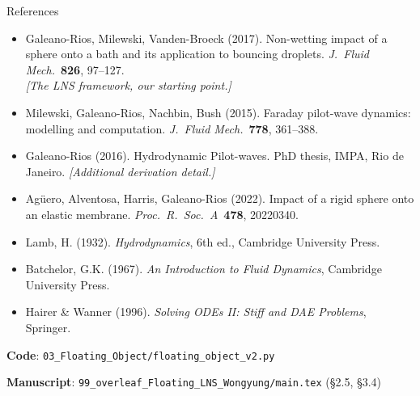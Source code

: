\documentclass[aspectratio=169, 10pt]{beamer}
\begin{document}
\begin{frame}{References}
\small
\begin{itemize}
    \item Galeano-Rios, Milewski, Vanden-Broeck (2017). Non-wetting impact of a sphere onto a bath and its application to bouncing droplets. \textit{J.~Fluid Mech.}~\textbf{826}, 97--127.  \\\emph{[The LNS framework, our starting point.]}

    \item Milewski, Galeano-Rios, Nachbin, Bush (2015). Faraday pilot-wave dynamics: modelling and computation. \textit{J.~Fluid Mech.}~\textbf{778}, 361--388.

    \item Galeano-Rios (2016). Hydrodynamic Pilot-waves. PhD thesis, IMPA, Rio de Janeiro. \emph{[Additional derivation detail.]}

    \item Ag\"uero, Alventosa, Harris, Galeano-Rios (2022). Impact of a rigid sphere onto an elastic membrane. \textit{Proc.~R.~Soc.~A}~\textbf{478}, 20220340.

    \item Lamb, H. (1932). \textit{Hydrodynamics}, 6th ed., Cambridge University Press.

    \item Batchelor, G.K. (1967). \textit{An Introduction to Fluid Dynamics}, Cambridge University Press.

    \item Hairer \& Wanner (1996). \textit{Solving ODEs II: Stiff and DAE Problems}, Springer.
\end{itemize}

\vspace{0.7em}
\textbf{Code}: \texttt{03\_Floating\_Object/floating\_object\_v2.py}

\textbf{Manuscript}: \texttt{99\_overleaf\_Floating\_LNS\_Wongyung/main.tex} (\S 2.5, \S 3.4)
\end{frame}
\end{document}
